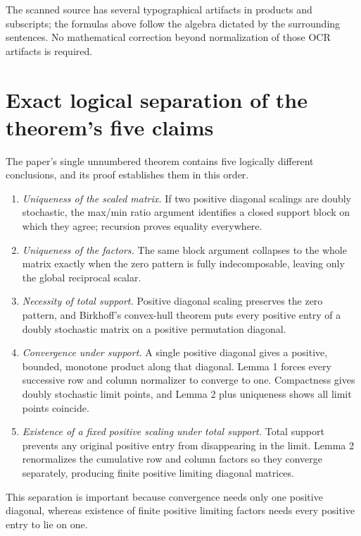 The scanned source has several typographical artifacts in products and subscripts; the formulas above follow the algebra dictated by the surrounding sentences.  No mathematical correction beyond normalization of those OCR artifacts is required.


\section{Exact logical separation of the theorem's five claims}
The paper's single unnumbered theorem contains five logically different conclusions, and its proof establishes them in this order.
\begin{enumerate}[leftmargin=2em]
\item \emph{Uniqueness of the scaled matrix.}  If two positive diagonal scalings are doubly stochastic, the max/min ratio argument identifies a closed support block on which they agree; recursion proves equality everywhere.
\item \emph{Uniqueness of the factors.}  The same block argument collapses to the whole matrix exactly when the zero pattern is fully indecomposable, leaving only the global reciprocal scalar.
\item \emph{Necessity of total support.}  Positive diagonal scaling preserves the zero pattern, and Birkhoff's convex-hull theorem puts every positive entry of a doubly stochastic matrix on a positive permutation diagonal.
\item \emph{Convergence under support.}  A single positive diagonal gives a positive, bounded, monotone product along that diagonal.  Lemma 1 forces every successive row and column normalizer to converge to one.  Compactness gives doubly stochastic limit points, and Lemma 2 plus uniqueness shows all limit points coincide.
\item \emph{Existence of a fixed positive scaling under total support.}  Total support prevents any original positive entry from disappearing in the limit.  Lemma 2 renormalizes the cumulative row and column factors so they converge separately, producing finite positive limiting diagonal matrices.
\end{enumerate}
This separation is important because convergence needs only one positive diagonal, whereas existence of finite positive limiting factors needs every positive entry to lie on one.

